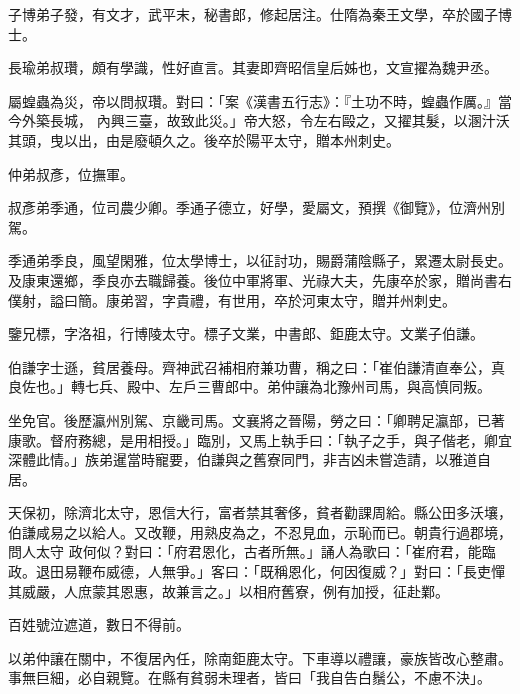 \begin{pinyinscope}
 子博弟子發，有文才，武平末，秘書郎，修起居注。仕隋為秦王文學，卒於國子博士。



 長瑜弟叔瓚，頗有學識，性好直言。其妻即齊昭信皇后姊也，文宣擢為魏尹丞。



 屬蝗蟲為災，帝以問叔瓚。對曰：「案《漢書五行志》：『土功不時，蝗蟲作厲。』當今外築長城，
 內興三臺，故致此災。」帝大怒，令左右毆之，又擢其髮，以溷汁沃其頭，曳以出，由是廢頓久之。後卒於陽平太守，贈本州刺史。



 仲弟叔彥，位撫軍。



 叔彥弟季通，位司農少卿。季通子德立，好學，愛屬文，預撰《御覽》，位濟州別駕。



 季通弟季良，風望閑雅，位太學博士，以征討功，賜爵蒲陰縣子，累遷太尉長史。及康東還鄉，季良亦去職歸養。後位中軍將軍、光祿大夫，先康卒於家，贈尚書右僕射，謚曰簡。康弟習，字貴禮，有世用，卒於河東太守，贈并州刺史。



 鑒兄標，字洛祖，行博陵太守。標子文業，中書郎、鉅鹿太守。文業子伯謙。



 伯謙字士遜，貧居養母。齊神武召補相府兼功曹，稱之曰：「崔伯謙清直奉公，真良佐也。」轉七兵、殿中、左戶三曹郎中。弟仲讓為北豫州司馬，與高慎同叛。



 坐免官。後歷瀛州別駕、京畿司馬。文襄將之晉陽，勞之曰：「卿聘足瀛部，已著康歌。督府務總，是用相授。」臨別，又馬上執手曰：「執子之手，與子偕老，卿宜深體此情。」族弟暹當時寵要，伯謙與之舊寮同門，非吉凶未嘗造請，以雅道自居。



 天保初，除濟北太守，恩信大行，富者禁其奢侈，貧者勸課周給。縣公田多沃壤，伯謙咸易之以給人。又改鞭，用熟皮為之，不忍見血，示恥而已。朝貴行過郡境，問人太守
 政何似？對曰：「府君恩化，古者所無。」誦人為歌曰：「崔府君，能臨政。退田易鞭布威德，人無爭。」客曰：「既稱恩化，何因復威？」對曰：「長吏憚其威嚴，人庶蒙其恩惠，故兼言之。」以相府舊寮，例有加授，征赴鄴。



 百姓號泣遮道，數日不得前。



 以弟仲讓在關中，不復居內任，除南鉅鹿太守。下車導以禮讓，豪族皆改心整肅。事無巨細，必自親覽。在縣有貧弱未理者，皆曰「我自告白鬚公，不慮不決」。




\end{pinyinscope}
